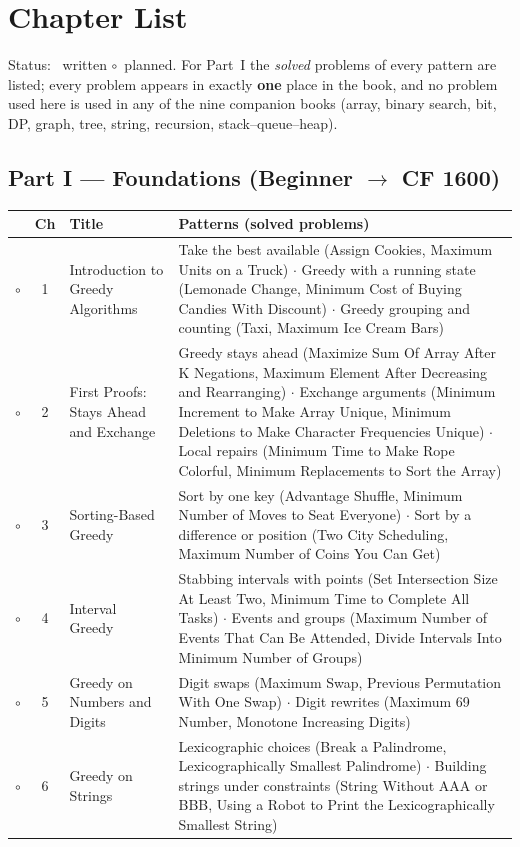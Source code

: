 \section*{Chapter List}

Status: \yes~written \quad $\circ$~planned. For Part~I the \emph{solved} problems of every pattern are listed; every problem appears in exactly \textbf{one} place in the book, and no problem used here is used in any of the nine companion books (array, binary search, bit, DP, graph, tree, string, recursion, stack--queue--heap).

\begingroup
\small
\renewcommand{\arraystretch}{1.25}

\subsection*{Part I --- Foundations (Beginner $\to$ CF 1600)}
\begin{tabularx}{\linewidth}{@{}c c >{\raggedright\arraybackslash}p{3.6cm} X@{}}
\toprule
& \textbf{Ch} & \textbf{Title} & \textbf{Patterns (solved problems)} \\
\midrule
$\circ$ & 1 & Introduction to Greedy Algorithms & Take the best available (Assign Cookies, Maximum Units on a Truck) $\cdot$ Greedy with a running state (Lemonade Change, Minimum Cost of Buying Candies With Discount) $\cdot$ Greedy grouping and counting (Taxi, Maximum Ice Cream Bars) \\
$\circ$ & 2 & First Proofs: Stays Ahead and Exchange & Greedy stays ahead (Maximize Sum Of Array After K Negations, Maximum Element After Decreasing and Rearranging) $\cdot$ Exchange arguments (Minimum Increment to Make Array Unique, Minimum Deletions to Make Character Frequencies Unique) $\cdot$ Local repairs (Minimum Time to Make Rope Colorful, Minimum Replacements to Sort the Array) \\
$\circ$ & 3 & Sorting-Based Greedy & Sort by one key (Advantage Shuffle, Minimum Number of Moves to Seat Everyone) $\cdot$ Sort by a difference or position (Two City Scheduling, Maximum Number of Coins You Can Get) \\
$\circ$ & 4 & Interval Greedy & Stabbing intervals with points (Set Intersection Size At Least Two, Minimum Time to Complete All Tasks) $\cdot$ Events and groups (Maximum Number of Events That Can Be Attended, Divide Intervals Into Minimum Number of Groups) \\
$\circ$ & 5 & Greedy on Numbers and Digits & Digit swaps (Maximum Swap, Previous Permutation With One Swap) $\cdot$ Digit rewrites (Maximum 69 Number, Monotone Increasing Digits) \\
$\circ$ & 6 & Greedy on Strings & Lexicographic choices (Break a Palindrome, Lexicographically Smallest Palindrome) $\cdot$ Building strings under constraints (String Without AAA or BBB, Using a Robot to Print the Lexicographically Smallest String) \\
\bottomrule
\end{tabularx}

